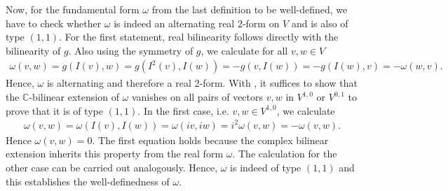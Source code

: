 Now, for the fundamental form $\omega$ from the last definition to be well-defined, we have
to check whether $\omega$ is indeed an alternating real 2-form on $V$ and is also of type $(1,1)$.
For the first statement, real bilinearity follows directly with the bilinearity of $g$. Also using the symmetry
of $g$, we calculate for all $v,w \in V$
\begin{align*}
	\omega(v,w) = g(I(v),w) = g(I^2(v),I(w)) = - g(v,I(w)) = - g(I(w),v) = -\omega(w,v).
\end{align*}
Hence, $\omega$ is alternating and therefore a real 2-form. With
, it suffices to show that the $\mathbb{C}$-bilinear
extension of $\omega$ vanishes on all pairs of vectors $v,w$ in $V^{1,0}$ or $V^{0,1}$ to
prove that it is of type $(1,1)$. In the first case, i.e. $v,w \in V^{1,0}$, we calculate
\begin{align*}
	\omega(v,w) = \omega(I(v),I(w)) = \omega(iv,iw) = i^2 \omega(v,w)  = -\omega(v,w).
\end{align*}
Hence $\omega(v,w) = 0$. The first equation holds because the complex bilinear extension
inherits this property from the real form $\omega$. The calculation for the other case can be carried out 
analogously. Hence, $\omega$ is indeed of type $(1,1)$ and this establishes the well-definedness of 
$\omega$.

